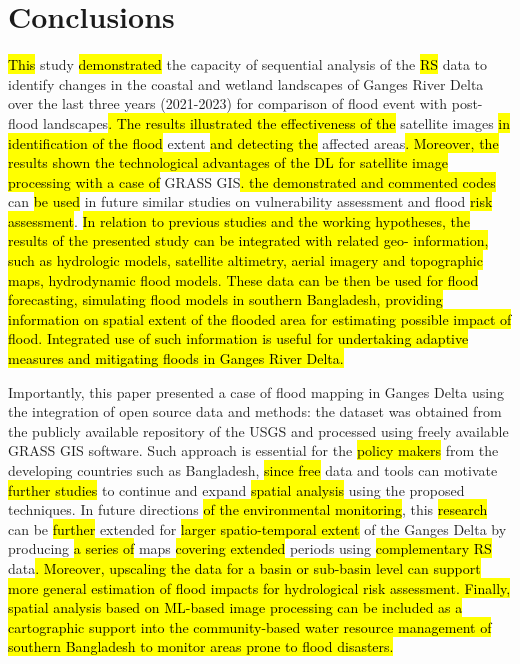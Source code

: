 \documentclass[water,article,submit,pdftex,moreauthors]{Definitions/mdpi}
\begin{document}
\section{Conclusions}
\hl{This} study \hl{demonstrated} the capacity of sequential analysis of the \hl{RS} data to identify changes in the coastal and wetland landscapes of Ganges River Delta over the last three years (2021-2023) for comparison of flood event with post-flood landscapes\hl{. The results illustrated the effectiveness of the} satellite images \hl{in identification of the flood} extent \hl{and detecting the} affected areas\hl{. Moreover, the results shown the technological advantages of the DL for satellite image processing with a case of}  GRASS GIS\hl{. the demonstrated and commented codes }can \hl{be used} in future\hl{ }similar studies on vulnerability assessment and\hl{ }flood \hl{risk assessment}. \hl{In relation to previous studies and the working hypotheses, the results of the presented study can be integrated with related geo- information, such as hydrologic models, satellite altimetry, aerial imagery and topographic maps, hydrodynamic flood models. These data can be then be used for flood forecasting, simulating flood models in southern Bangladesh, providing information on spatial extent of the flooded area for estimating possible impact of flood. Integrated use of such information is useful  for undertaking adaptive measures and mitigating floods in Ganges River Delta.}

Importantly, this paper presented a case of flood mapping in Ganges Delta using the integration of open source data and methods: the dataset was obtained from the publicly available repository of the USGS and processed using freely available GRASS GIS software. Such approach is essential for the \hl{policy makers} from the developing countries such as Bangladesh, \hl{since free} data and tools can motivate \hl{further studies} to continue and expand \hl{spatial analysis} using the proposed techniques. In future directions \hl{of the environmental monitoring}, this \hl{research} can be \hl{further }extended for \hl{larger spatio-temporal extent }of the Ganges Delta by producing \hl{a series of }maps \hl{covering extended} periods using \hl{complementary RS} data\hl{. Moreover, upscaling the data for a basin or sub-basin level can support more general estimation of flood impacts for hydrological risk assessment. Finally, spatial analysis based on ML-based image processing can be included as a cartographic support into the community-based water resource management of southern Bangladesh to monitor areas prone to flood disasters.}
\end{document}
